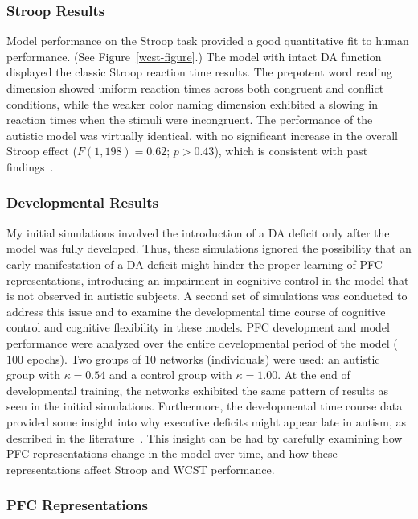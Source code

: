 \documentclass[man]{apa}
\begin{document}
\subsubsection{Stroop Results} 

Model performance on the Stroop task provided a good quantitative fit to human performance.  (See Figure~\ref{wcst-figure}.) The model with intact DA function displayed the classic Stroop reaction time results.  The prepotent word reading dimension showed uniform reaction times across both congruent and conflict conditions, while the weaker color naming dimension exhibited a slowing in reaction times when the stimuli were incongruent.  The performance of the autistic model was virtually identical, with no significant increase in the overall Stroop effect ($F(1,198) = 0.62$; $p > 0.43$), which is consistent with past findings~\cite{Ozonoff:1999:AutismStroopWCST}.


\subsubsection{Developmental Results}

My initial simulations involved the introduction of a DA deficit only
after the model was fully developed.  Thus, these simulations ignored
the possibility that an early manifestation of a DA deficit might
hinder the proper learning of PFC representations, introducing an
impairment in cognitive control in the model that is not observed in
autistic subjects.  A second set of simulations was conducted to
address this issue and to examine the developmental time course of
cognitive control and cognitive flexibility in these models.  PFC
development and model performance were analyzed over the entire
developmental period of the model ($100$ epochs).  Two groups of $10$
networks (individuals) were used: an autistic group with $\kappa = 0.54$
and a control group with $\kappa = 1.00$.  At the end of developmental
training, the networks exhibited the same pattern of results as seen
in the initial simulations.  Furthermore, the developmental time
course data provided some insight into why executive deficits might
appear late in autism, as described in the
literature~\cite{GriffithEM:1999:AutismYoungED}.  This insight can be had by carefully examining how PFC representations change in the model over time, and how these representations affect Stroop and WCST performance.

\subsubsection{PFC Representations} 
\end{document}
